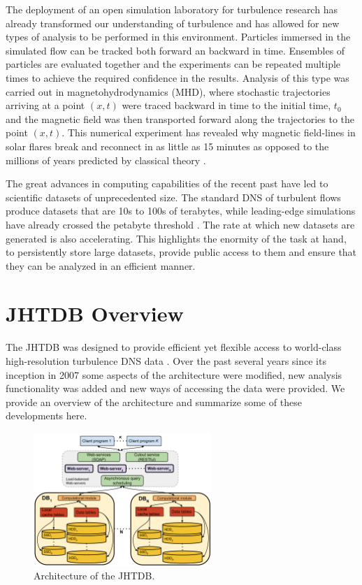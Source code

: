 \documentclass[10pt,twocolumn]{article}
\begin{document}
The deployment of an open simulation laboratory for turbulence research has already transformed our understanding of turbulence and has allowed for new
types of analysis to be performed in this environment. Particles immersed in the simulated flow can be tracked both forward an backward in time. 
Ensembles of particles are evaluated together and the experiments can be repeated multiple times to achieve the required confidence in the results.
Analysis of this type was carried out in magnetohydrodynamics (MHD), where stochastic trajectories arriving at a point $(x, t)$ were traced backward in 
time to the initial time, $t_0$ and the magnetic field was then transported forward along the trajectories to the point $(x, t)$. This numerical experiment has
revealed why magnetic field-lines in solar flares break and reconnect in as little as 15 minutes as opposed to the millions of years predicted by classical 
theory \cite{Eyink}.

The great advances in computing capabilities of the recent past have led to scientific datasets of unprecedented size. The standard DNS of turbulent flows
produce datasets that are 10s to 100s of terabytes, while leading-edge simulations have already crossed the petabyte threshold \cite{Lee}. The rate at
which new datasets are generated is also accelerating. This highlights the enormity of the task at hand, to persistently store large datasets, provide public access
to them and ensure that they can be analyzed in an efficient manner. 

\section{JHTDB Overview}

The JHTDB was designed to provide efficient yet flexible access to world-class high-resolution turbulence DNS data \cite{Yi, Perlman}. Over the past
several years since its inception in 2007 some aspects of the architecture were modified, new analysis functionality was added and new ways of accessing
the data were provided. We provide an overview of the architecture and summarize some of these developments here.

\begin{figure}
\includegraphics[width=0.6\textwidth]{jhtdb_diagram.pdf}
\caption{Architecture of the JHTDB.}
\label{fig:architecture}
\end{figure}
\end{document}
